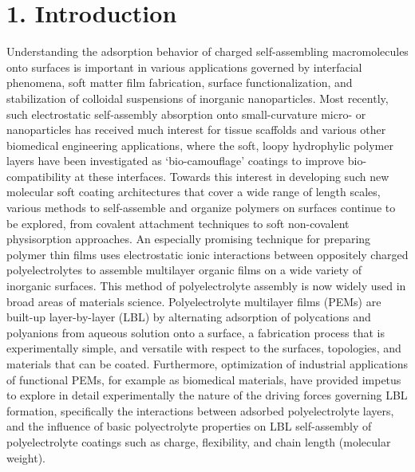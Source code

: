 \documentclass[journal=mamobx,manuscript=article]{achemso}
\begin{document}
\section{1. Introduction}  %
    \label{sec-intro}
Understanding the adsorption behavior of charged self-assembling macromolecules onto surfaces is important in various applications governed by interfacial phenomena, soft matter film fabrication, surface functionalization, and stabilization of colloidal suspensions of inorganic nanoparticles.\cite{Dorris2011}  Most recently, such electrostatic self-assembly absorption onto small-curvature micro- or 
nanoparticles has received much interest for tissue scaffolds and various other biomedical engineering applications, where the soft, loopy hydrophylic polymer layers have been investigated as `bio-camouflage' coatings to improve bio-compatibility at these interfaces.\cite{Landry2019} 
Towards this interest in developing such new molecular soft coating architectures that cover a wide range of length scales, various methods to self-assemble and organize polymers on surfaces continue to be explored, from covalent attachment techniques\cite{doi:10.1002/ijch.199600050,B210143M,doi:10.1002/masy.200450305} to soft non-covalent physisorption approaches.\cite{Chen1992,Serizawa2002}  
An especially promising technique for preparing polymer thin films uses electrostatic ionic interactions between oppositely charged polyelectrolytes to assemble multilayer organic films on a wide variety of inorganic surfaces.  This method of polyelectrolyte assembly is now widely used in broad areas of materials science.\cite{Decher1997}  
Polyelectrolyte multilayer films (PEMs) are built-up layer-by-layer (LBL) by alternating adsorption of polycations and polyanions from aqueous solution onto a surface,\cite{Decher2006}  
a fabrication process that is experimentally simple, and versatile with respect to the surfaces, topologies, and materials that can be coated.  
Furthermore, optimization of industrial applications of functional PEMs, for example as biomedical materials, have provided impetus to explore in detail experimentally the nature of the driving forces governing LBL formation, specifically the interactions between adsorbed polyelectrolyte layers, and the influence of basic polyectrolyte properties on LBL self-assembly of polyelectrolyte coatings such as charge, flexibility, and chain length (molecular weight).
\end{document}
